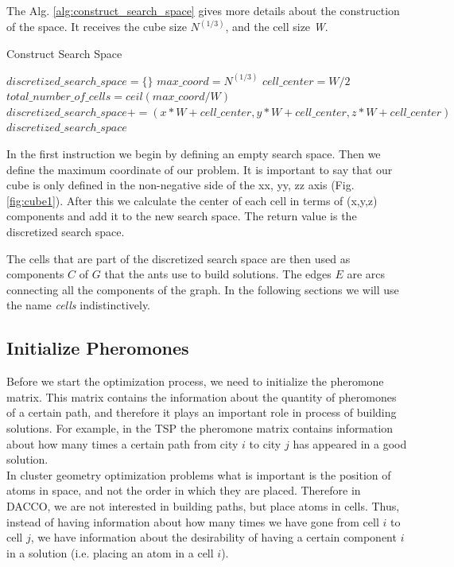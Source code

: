 	The Alg. \ref{alg:construct_search_space} gives more details about the construction of the space. It receives the cube size $N^{(1/3)}$, and the cell size \emph{W}.
	\begin{algorithm}
		\caption{Construct Search Space}
		\label{alg:construct_search_space}
		\begin{algorithmic}
		\STATE $discretized\_search\_space = \{\}$
		\STATE $max\_coord = N^{(1/3)}$
		\STATE $cell\_center = W / 2$
		\STATE $total\_number\_of\_cells = ceil(max\_coord / W)$
					\STATE $discretized\_search\_space += (x * W + cell\_center,  y * W + cell\_center, z * W + cell\_center)$
				\ENDFOR
			\ENDFOR
		\ENDFOR
		\RETURN $discretized\_search\_space$
		\end{algorithmic}
	\end{algorithm}
	In the first instruction we begin by defining an empty search space. Then we define the maximum coordinate of our problem. It is important to say that our cube is only defined in the non-negative side of the xx, yy, zz axis (Fig. \ref{fig:cube1}). After this we calculate the center of each cell in terms of (x,y,z) components and add it to the new search space. 
	The return value is the discretized search space.
	
	The cells that are part of the discretized search space are then used as components $C$ of $G$ that the ants use to build solutions. The edges $E$ are arcs connecting all the components of the graph. In the following sections we will use the name \emph{cells} indistinctively.
	\subsection{Initialize Pheromones}
	Before we start the optimization process, we need to initialize the pheromone matrix. This matrix contains the information about the quantity of pheromones of a certain path, and therefore it plays an important role in process of building solutions. For example, in the TSP the pheromone matrix contains information about how many times a certain path from city $i$ to city $j$ has appeared in a good solution.\\
	In cluster geometry optimization problems what is important is the position of atoms in space, and not the order in which they are placed. Therefore in DACCO, we are not interested in building paths, but place atoms in cells. Thus, instead of having information about how many times we have gone from cell $i$ to cell $j$, we have information about the desirability of having a certain component $i$ in a solution (i.e. placing an atom in a cell $i$).
	
